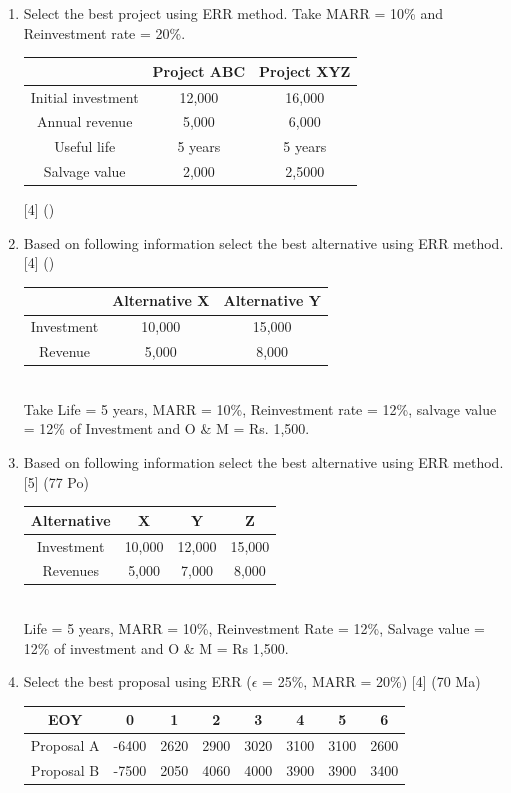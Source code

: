 \documentclass[12pt]{article}
\begin{document}
\begin{enumerate}
			\item Select the best project using ERR method. Take MARR = 10\% and Reinvestment rate = 20\%.\\
			\begin{tabular}{|c|c|c|}
				\hline
				& Project ABC & Project XYZ \\ \hline
				Initial investment & 12,000 & 16,000 \\ \hline
				Annual revenue & 5,000 & 6,000 \\ \hline
				Useful life & 5 years & 5 years \\ \hline
				Salvage value & 2,000 & 2,5000 \\ \hline
			\end{tabular}  \hfill [4] ()

			\item Based on following information select the best alternative using ERR method. \hfill [4] ()\\
			\begin{tabular}{|c|c|c|}
				\hline
				& Alternative X & Alternative Y \\ \hline
				Investment & 10,000 & 15,000 \\ \hline
				Revenue & 5,000 & 8,000 \\ \hline
			\end{tabular}\\
			Take Life = 5 years, MARR = 10\%, Reinvestment rate = 12\%, salvage value = 12\% of Investment and O \& M = Rs. 1,500.

			\item Based on following information select the best alternative using ERR method. \hfill [5] (77 Po)
			\begin{tabular}{|c|c|c|c|}
				\hline
				Alternative & X & Y & Z \\ \hline
				Investment & 10,000 & 12,000 & 15,000 \\ \hline
				Revenues & 5,000 & 7,000 & 8,000 \\ \hline
			\end{tabular}\\
			Life = 5 years, MARR = 10\%, Reinvestment Rate = 12\%, Salvage value = 12\% of investment and O \& M = Rs 1,500.
			
			\item Select the best proposal using ERR ($\epsilon$ = 25\%, MARR = 20\%) \hfill [4] (70 Ma)\\
			\begin{tabular}{|c|c|c|c|c|c|c|c|}
				\hline
				EOY & 0 & 1 & 2 & 3 & 4 & 5 & 6 \\ \hline
				Proposal A & -6400 & 2620 & 2900 & 3020 & 3100 & 3100 & 2600 \\ \hline
				Proposal B & -7500 & 2050 & 4060 & 4000 & 3900 & 3900 & 3400 \\ \hline
			\end{tabular}
		\end{enumerate}
	
\end{document}
